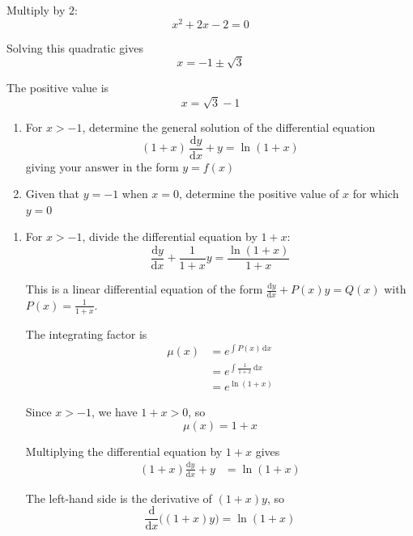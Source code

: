 \documentclass[leqno]{article}
\begin{document}
\begin{enumerate}[
  label=\textbf{\arabic*.},
  leftmargin=*,
  topsep=0pt,
  partopsep=0pt,
  parsep=0pt
]
\begin{djsSolution}
\begin{enumerate}[label=\textbf{(\alph*)}]
Multiply by $2$:
\[
x^2+2x-2=0
\]

Solving this quadratic gives
\[
x=-1\pm \sqrt{3}
\]

The positive value is
\[
x=\sqrt{3}-1
\]
\end{enumerate}
\end{djsSolution}


\newpage

\questionitem

\begin{enumerate}[label=\textbf{(\alph*)}]
  \item For $x>-1$, determine the general solution of the differential equation
  \[
  (1+x)\,\frac{\mathrm{d}y}{\mathrm{d}x}+y=\ln(1+x)
  \]
  giving your answer in the form $y=f(x)$  \\
  \item Given that $y=-1$ when $x=0$, determine the positive value of $x$ for which $y=0$  \\
\end{enumerate}

\vspace*{10pt}

\begin{djsSolution}
\begin{enumerate}[label=\textbf{(\alph*)}]
  \item For $x>-1$, divide the differential equation by $1+x$:
\[
\frac{\mathrm{d}y}{\mathrm{d}x}+\frac{1}{1+x}y=\frac{\ln(1+x)}{1+x}
\]

This is a linear differential equation of the form \(\frac{\mathrm{d}y}{\mathrm{d}x}+P(x)y=Q(x)\) with \(P(x)=\frac{1}{1+x}\).

The integrating factor is
\begin{align*}
\mu(x)&=e^{\int P(x)\,\mathrm{d}x} \\
&=e^{\int \frac{1}{1+x}\, \mathrm{d}x} \\
&=e^{\ln(1+x)}
\end{align*}

Since $x>-1$, we have $1+x>0$, so
\[
\mu(x)=1+x
\]

Multiplying the differential equation by $1+x$ gives
\begin{align*}
(1+x)\frac{\mathrm{d}y}{\mathrm{d}x}+y&=\ln(1+x)
\end{align*}

The left-hand side is the derivative of $(1+x)y$, so
\[
\frac{\mathrm{d}}{\mathrm{d}x}\bigl((1+x)y\bigr)=\ln(1+x)
\]


\end{enumerate}
\end{djsSolution}
\end{enumerate}
\end{document}
